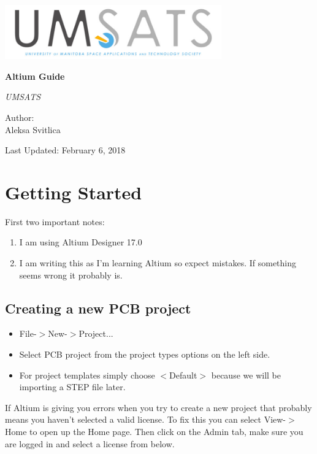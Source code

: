 \documentclass{article}
\begin{document}
	\begin{titlepage}
		\centering
		\includegraphics[width=0.7\textwidth]{"logo"}\par\vspace{1cm}
		\vspace{1cm}
		\vspace{1.5cm}
		{\huge\bfseries Altium Guide\par}
		\vspace{2cm}
		{\Large\itshape UMSATS\par}
		\vfill
		Author:\\ Aleksa Svitlica%
		\par		
		\vfill
		
		{\large Last Updated: February 6, 2018\par}
	\end{titlepage}
	\tableofcontents
	\newpage
	
	\section{Getting Started}
	First two important notes:
	\begin{enumerate}
		\item I am using Altium Designer 17.0
		\item I am writing this as I'm learning Altium so expect mistakes. If something seems wrong it probably is.
	\end{enumerate}

	\subsection{Creating a new PCB project}
	\begin{itemize}
		\item File-$>$New-$>$Project...
		\item Select PCB project from the project types options on the left side.
		\item For project templates simply choose $<$Default$>$ because we will be importing a STEP file later.
	\end{itemize}
	If Altium is giving you errors when you try to create a new project that probably means you haven't selected a valid license. To fix this you can select View-$>$Home to open up the Home page. Then click on the Admin tab, make sure you are logged in and select a license from below.
\end{document}
